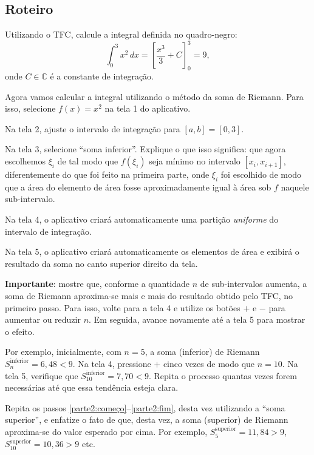 \documentclass[a4paper,12pt]{scrartcl}
\newcommand\importante{\textbf{Importante}}
\begin{document}
      \subsection*{Roteiro}
           
      \begin{list}{.}{
	\setlength\leftmargin{0cm}%
	\setlength\itemindent\parindent%
	\setlength\listparindent{\parindent}%
        \setlength{}%
        \setlength{}%
      }
    
	\item Utilizando o TFC, calcule a integral definida no quadro-negro:
	\begin{equation*}
	  \int_0^3 x^2\, dx = \left[\frac{x^3}{3} + C\right]_0^3 = 9,
	\end{equation*}
	onde $C\in\mathbb{C}$ é a constante de integração.

	\item Agora vamos calcular a integral utilizando o método da soma de Riemann. Para isso, selecione $f(x) = x^2$ na tela 1 do aplicativo.
	\item Na tela 2, ajuste o intervalo de integração para $[a,b] = [0,3]$.
	\item\label{parte2:começo} Na tela 3, selecione ``soma inferior''. Explique o que isso significa: que agora escolhemos $\xi_i$ de tal modo que $f(\xi_i)$
	seja mínimo no intervalo $[x_i,x_{i+1}]$, diferentemente do que foi feito na primeira parte, onde $\xi_i$ foi escolhido de modo que a área do
	elemento de área fosse aproximadamente igual à área sob $f$ naquele sub-intervalo.
	
	\item Na tela 4, o aplicativo criará automaticamente uma partição \emph{uniforme} do intervalo de integração.
	\item Na tela 5, o aplicativo criará automaticamente os elementos de área e exibirá o resultado da soma no canto superior direito da tela.
	\item\label{parte2:fim} \importante: mostre que, conforme a quantidade $n$ de sub-intervalos aumenta, a soma de Riemann aproxima-se mais e mais
	do resultado obtido pelo TFC, no primeiro passo. Para isso, volte para a tela 4 e utilize os botões $+$ e $-$ para aumentar ou reduzir $n$.
	Em seguida, avance novamente até a tela 5 para mostrar o efeito.
	
	Por exemplo, inicialmente, com $n = 5$, a soma (inferior) de Riemann $S_n^{\text{inferior}} = 6,48 < 9$.
	Na tela 4, pressione $+$ cinco vezes de modo que $n = 10$. Na tela 5, verifique que $S_{10}^{\text{inferior}} = 7,70 < 9$. Repita o processo quantas vezes forem necessárias
	até que essa tendência esteja clara.
	\item Repita os passos \ref{parte2:começo}--\ref{parte2:fim}, desta vez utilizando a ``soma superior'', e enfatize o fato de que, desta vez, a soma (superior) de Riemann
	aproxima-se do valor esperado por cima. Por exemplo, $S_5^{\text{superior}} = 11,84 > 9$, $S_{10}^{\text{superior}} = 10,36 > 9$ etc.
	

\end{list}
\end{document}

